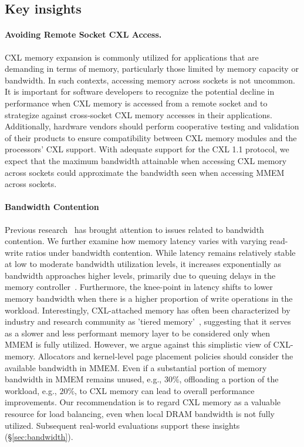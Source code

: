 \subsection{Key insights}
\paragraph{Avoiding Remote Socket CXL Access.}
CXL memory expansion is commonly utilized for applications that are demanding in terms of memory, particularly those limited by memory capacity or bandwidth. In such contexts, accessing memory across sockets is not uncommon. It is important for software developers to recognize the potential decline in performance when CXL memory is accessed from a remote socket and to strategize against cross-socket CXL memory accesses in their applications. Additionally, hardware vendors should perform cooperative testing and validation of their products to ensure compatibility between CXL memory modules and the processors' CXL support. With adequate support for the CXL 1.1 protocol, we expect that the maximum bandwidth attainable when accessing CXL memory across sockets could approximate the bandwidth seen when accessing MMEM across sockets.

\paragraph{Bandwidth Contention}
Previous research~\cite{mt2, cxlcentric} has brought attention to issues related to bandwidth contention. We further examine how memory latency varies with varying read-write ratios under bandwidth contention. While latency remains relatively stable at low to moderate bandwidth utilization levels, it increases exponentially as bandwidth approaches higher levels, primarily due to queuing delays in the memory controller~\cite{cxl-centric}. Furthermore, the knee-point in latency shifts to lower memory bandwidth when there is a higher proportion of write operations in the workload. Interestingly, CXL-attached memory has often been characterized by industry and research community as 'tiered memory'~\cite{demystify, tpppatch, Interleavepatch}, suggesting that it serves as a slower and less performant memory layer to be considered only when MMEM is fully utilized.
However, we argue against this simplistic view of CXL-memory. Allocators and kernel-level page placement policies should consider the available bandwidth in MMEM.
Even if a substantial portion of memory bandwidth in MMEM remains unused, e.g., $30\%$, offloading a portion of the workload, e.g., $20\%$, to CXL memory can lead to overall performance improvements. 
Our recommendation is to regard CXL memory as a valuable resource for load balancing, even when local DRAM bandwidth is not fully utilized. Subsequent real-world evaluations support these insights (\S\ref{sec:bandwidth}).

